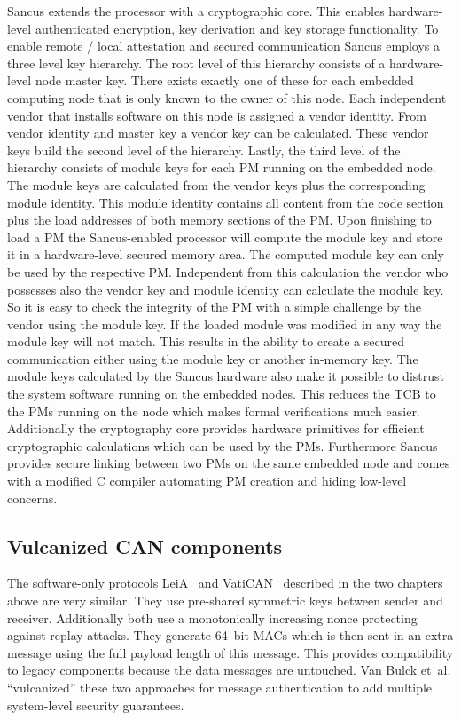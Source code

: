 Sancus extends the processor with a cryptographic core. This enables
hardware-level authenticated encryption, key derivation and key storage
functionality. To enable remote / local attestation and secured communication
Sancus employs a three level key hierarchy. The root level of this hierarchy
consists of a hardware-level node master key. There exists exactly one of these
for each embedded computing node that is only known to the owner of this node.
Each independent vendor that installs software on this node is assigned a vendor
identity. From vendor identity and master key a vendor key can be calculated.
These vendor keys build the second level of the hierarchy. Lastly, the third
level of the hierarchy consists of module keys for each PM running on the
embedded node. The module keys are calculated from the vendor keys plus the
corresponding module identity. This module identity contains all content from
the code section plus the load addresses of both memory sections of the PM\@.
Upon finishing to load a PM the Sancus-enabled processor will compute the module
key and store it in a hardware-level secured memory area. The computed module
key can only be used by the respective PM\@. Independent from this calculation
the vendor who possesses also the vendor key and module identity can calculate
the module key. So it is easy to check the integrity of the PM with a simple
challenge by the vendor using the module key. If the loaded module was modified
in any way the module key will not match. This results in the ability to create
a secured communication either using the module key or another in-memory key.
The module keys calculated by the Sancus hardware also make it possible to
distrust the system software running on the embedded nodes. This reduces the TCB
to the PMs running on the node which makes formal verifications much easier.
Additionally the cryptography core provides hardware primitives for efficient
cryptographic calculations which can be used by the PMs. Furthermore Sancus
provides secure linking between two PMs on the same embedded node and comes with
a modified C compiler automating PM creation and hiding low-level concerns.

\subsection{Vulcanized CAN components}

The software-only protocols LeiA~\cite{Radu2016} and
VatiCAN~\cite{Nurnberger2016} described in the two chapters above are very
similar. They use pre-shared symmetric keys between sender and receiver.
Additionally both use a monotonically increasing nonce protecting against replay
attacks. They generate 64~bit MACs which is then sent in an extra message using
the full payload length of this message. This provides compatibility to legacy
components because the data messages are untouched. Van Bulck et~al.
``vulcanized'' these two approaches for message authentication to add multiple
system-level security guarantees. 


